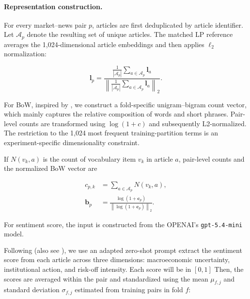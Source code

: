 \paragraph*{Representation construction.}
For every market--news pair $p$, articles are first deduplicated by article
identifier. Let $\mathcal{A}_p$ denote the resulting set of unique articles.
The matched LP reference averages the 1,024-dimensional article embeddings and
then applies $\ell_2$ normalization:

\begin{equation}\label{eq:ch3:rq2_lp_pair}
\mathbf{l}_p
=
\frac{\frac{1}{|\mathcal{A}_p|}
\sum_{a\in\mathcal{A}_p}\mathbf{l}_a}
{\left\|\frac{1}{|\mathcal{A}_p|}
\sum_{a\in\mathcal{A}_p}\mathbf{l}_a\right\|_2}.
\end{equation}


For BoW, inspired by \cite{manela2017news}, we construct a fold-specific unigram–bigram count vector, which mainly captures the relative composition of words and short phrases. Pair-level counts are transformed using \(\log(1+c)\) and subsequently L2-normalized. The restriction to the 1,024 most frequent training-partition terms is an experiment-specific dimensionality constraint.

If $N(v_k,a)$ is the count of vocabulary item $v_k$ in article $a$, pair-level counts and the normalized BoW vector are

\begin{equation}\label{eq:ch3:rq2_bow_pair}
\begin{aligned}
c_{p,k} &= \sum_{a\in\mathcal{A}_p}N(v_k,a),\\
\mathbf{b}_p
&=\frac{\log(1+\mathbf{c}_p)}
{\left\|\log(1+\mathbf{c}_p)\right\|_2}.
\end{aligned}
\end{equation}


For sentiment score, the input is constructed from the OPENAI's \texttt{gpt-5.4-mini}
model.


Following \citet{sun2026zeroshot} (also see \citet{baker2016measuring, jurado2015measuring, dungey2018testing,baele2020flights,tetlock2007giving}), we use an adapted zero-shot prompt extract the sentiment score from each article across three dimensions: macroeconomic uncertainty, institutional action, and risk-off intensity. Each score will be in $[0,1]$ Then, the scores are averaged within the pair and standardized using the mean $\mu_{f,j}$ and standard deviation $\sigma_{f,j}$ estimated from training pairs in fold $f$:


